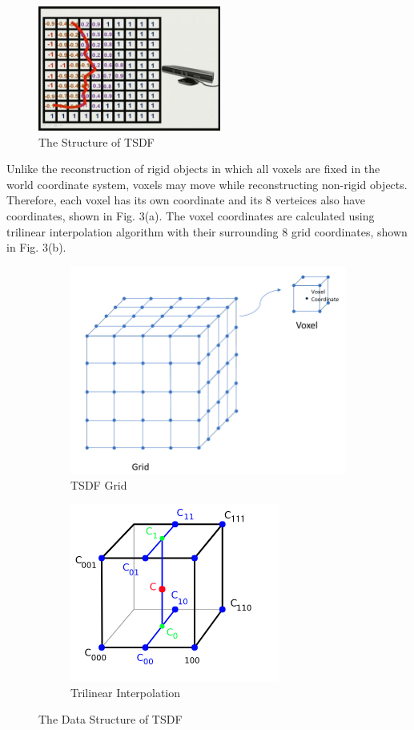 \documentclass{article}
\begin{document}
\begin{figure}[htp]
\centering
\includegraphics[width=6cm]{figures/tsdf.jpg}
\caption{The Structure of TSDF}
\label{fig:TSDF}
\end{figure}

Unlike the reconstruction of rigid objects in which all voxels are fixed in the world coordinate system, voxels may move while reconstructing non-rigid objects. Therefore, each voxel has its own coordinate and its 8 verteices also have coordinates, shown in Fig. 3(a). The voxel coordinates are calculated using trilinear interpolation algorithm with their surrounding 8 grid coordinates, shown in Fig. 3(b).

\begin{figure}
\centering
\begin{subfigure}{.65\textwidth}
  \centering
  \includegraphics[width=.65\linewidth]{figures/DataStruct.png}
  \caption{TSDF Grid}
  \label{fig:sub1}
\end{subfigure}%
\begin{subfigure}{.35\textwidth}
  \centering
  \includegraphics[width=.35\linewidth]{figures/3D_interpolation.png}
  \caption{Trilinear Interpolation}
  \label{fig:sub2}
\end{subfigure}
\caption{The Data Structure of TSDF}
\label{fig:test}
\end{figure}
\end{document}
